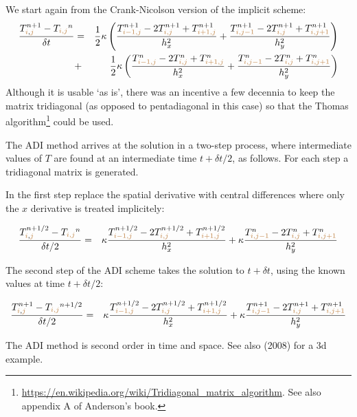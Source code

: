 We start again from the Crank-Nicolson version of the implicit scheme:
\begin{eqnarray}
\frac{T_{{\color{brown}i},{\color{brown}j}}^{n+1}-T_{\color{brown}i,j}^n}{\delta t}
&=& \frac12 \kappa
\left(
\frac{ T_{{\color{brown}i-1,j}}^{n+1}-2T_{{\color{brown}i,j}}^{n+1}+T_{{\color{brown}i+1,j}}^{n+1} }{h_x^2} + 
\frac{ T_{{\color{brown}i,j-1}}^{n+1}-2T_{{\color{brown}i,j}}^{n+1}+T_{{\color{brown}i,j+1}}^{n+1} }{h_y^2}
\right) \nonumber\\
&+& \frac12 \kappa
\left(
\frac{ T_{{\color{brown}i-1,j}}^{n}-2T_{{\color{brown}i,j}}^{n}+T_{{\color{brown}i+1,j}}^{n} }{h_x^2} + 
\frac{ T_{{\color{brown}i,j-1}}^{n}-2T_{{\color{brown}i,j}}^{n}+T_{{\color{brown}i,j+1}}^{n} }{h_y^2}
\right)
\end{eqnarray}
Although it is usable `as is', there was an incentive a few decennia to keep the matrix 
tridiagonal (as opposed to pentadiagonal in this case) so that the Thomas algorithm\footnote{
\url{https://en.wikipedia.org/wiki/Tridiagonal_matrix_algorithm}.
See also appendix A of Anderson's book.} could be used.

The ADI method arrives at the solution in a two-step process, where intermediate values
of $T$ are found at an intermediate time $t+\delta t/2$, as follows. For each step a tridiagonal 
matrix is generated.

In the first step replace the spatial derivative with central differences where only the $x$ derivative is treated 
implicitely:

\begin{eqnarray}
\frac{T_{{\color{brown}i},{\color{brown}j}}^{n+1/2}-T_{\color{brown}i,j}^n}{\delta t/2}
&=& \kappa \frac{ T_{{\color{brown}i-1,j}}^{n+1/2}-2T_{{\color{brown}i,j}}^{n+1/2}+T_{{\color{brown}i+1,j}}^{n+1/2} }{h_x^2} 
+\kappa \frac{ T_{{\color{brown}i,j-1}}^{n}-2T_{{\color{brown}i,j}}^{n}+T_{{\color{brown}i,j+1}}^{n} }{h_y^2}
\end{eqnarray}

The second step of the ADI scheme takes the solution to $t+\delta t$, using the known values 
at time $t+\delta t/2$:

\begin{eqnarray}
\frac{T_{{\color{brown}i},{\color{brown}j}}^{n+1}-T_{\color{brown}i,j}^{n+1/2}}{\delta t/2}
&=& \kappa \frac{ T_{{\color{brown}i-1,j}}^{n+1/2}-2T_{{\color{brown}i,j}}^{n+1/2}+T_{{\color{brown}i+1,j}}^{n+1/2} }{h_x^2} 
+\kappa 
\frac{ T_{{\color{brown}i,j-1}}^{n+1}-2T_{{\color{brown}i,j}}^{n+1}+T_{{\color{brown}i,j+1}}^{n+1} }{h_y^2}
\end{eqnarray}

The ADI method is second order in time and space.
See also \textcite{krdp08} (2008) for a 3d example.




 
